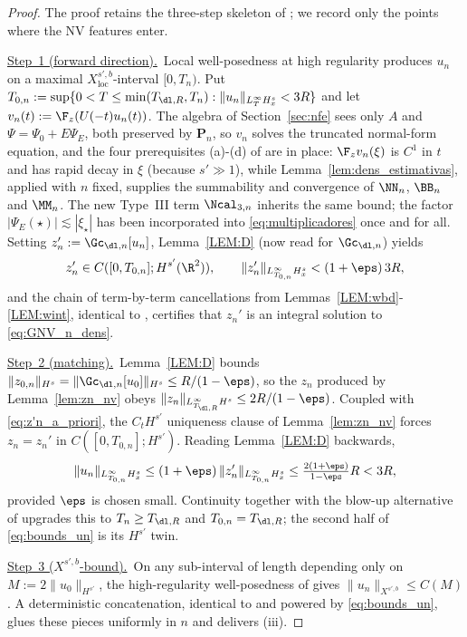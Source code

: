 \begin{proof}
The proof retains the three-step skeleton of
\cite[Lemma~5.5]{chcora}; we record only the points where the NV
features enter.

\smallskip
\noindent\underline{Step~1 (forward direction).}\
Local well-posedness at high regularity
\cite{angelopolous,kazeykinamunoz1,kazeykinamunoz2} produces $u_n$
on a maximal $X^{s',b}_{\mathrm{loc}}$-interval $[0,T_n)$. Put
$T_{0,n}:=\sup\{0<T\le\min(T_{\dl,R},T_n):
\|u_n\|_{L^\infty_T H^s_x}<3R\}$ and let
$v_n(t):=\F_z(U(-t)u_n(t))$. The algebra of
Section~\ref{sec:nfe} sees only $A$ and $\Psi=\Psi_0+E\Psi_E$, both
preserved by $\mathbf{P}_n$, so $v_n$ solves the truncated normal-form
equation, and the four prerequisites (a)-(d) of
\cite[\S4]{KOY20} are in place: $\F_z v_n(\xi)$ is $C^1$ in $t$ and
has rapid decay in $\xi$ (because $s'\gg 1$), while
Lemma~\ref{lem:dens_estimativas}, applied with $n$ fixed, supplies
the summability and convergence of $\NN_n$, $\BB_n$ and $\MM_n$.
The new Type~III term $\Ncal_{3,n}$ inherits the same bound; the
factor $|\Psi_E(\star)|\lesssim|\xi_\star|$ has been incorporated
into \eqref{eq:multiplicadores} once and for all. Setting
$z_n':=\Gc_{\dl,n}[u_n]$, Lemma~\ref{LEM:D} (now read for
$\Gc_{\dl,n}$) yields
\begin{equation}\label{eq:z'n_a_priori}
z_n'\in C([0,T_{0,n}];H^{s'}(\R^2)),
\qquad
\|z_n'\|_{L^\infty_{T_{0,n}}H^s_x}<(1+\eps)\,3R,
\end{equation}
and the chain of term-by-term cancellations from
Lemmas~\ref{LEM:wbd}-\ref{LEM:wint}, identical to
\cite{chcora}, certifies that $z_n'$ is an integral solution to
\eqref{eq:GNV_n_dens}.

\smallskip
\noindent\underline{Step~2 (matching).}\
Lemma~\ref{LEM:D} bounds
$\|z_{0,n}\|_{H^s}=\|\Gc_{\dl,n}[u_0]\|_{H^s}\le R/(1-\eps)$, so the
$z_n$ produced by Lemma~\ref{lem:zn_nv} obeys
$\|z_n\|_{L^\infty_{T_{\dl,R}}H^s}\le 2R/(1-\eps)$. Coupled with
\eqref{eq:z'n_a_priori}, the $C_t H^{s'}$ uniqueness clause of
Lemma~\ref{lem:zn_nv} forces $z_n=z_n'$ in $C([0,T_{0,n}];H^{s'})$.
Reading Lemma~\ref{LEM:D} backwards,
\begin{equation}\label{eq:un_bound_step2}
\|u_n\|_{L^\infty_{T_{0,n}}H^s_x}
\le (1+\eps)\,\|z_n'\|_{L^\infty_{T_{0,n}}H^s_x}
\le \tfrac{2(1+\eps)}{1-\eps}R<3R,
\end{equation}
provided $\eps$ is chosen small. Continuity together with the
blow-up alternative of
\cite{angelopolous,kazeykinamunoz1,kazeykinamunoz2} upgrades this to
$T_n\ge T_{\dl,R}$ and $T_{0,n}=T_{\dl,R}$; the second half of
\eqref{eq:bounds_un} is its $H^{s'}$ twin.

\smallskip
\noindent\underline{Step~3 ($X^{s',b}$-bound).}\
On any sub-interval of length depending only on
$M:=2\|u_0\|_{H^{s'}}$, the high-regularity well-posedness of
\cite{angelopolous,kazeykinamunoz1,kazeykinamunoz2} gives
$\|u_n\|_{X^{s',b}}\le C(M)$. A deterministic concatenation,
identical to \cite[Lemma~5.5, Step~3]{chcora} and powered by
\eqref{eq:bounds_un}, glues these pieces uniformly in $n$ and
delivers (iii).
\end{proof}

